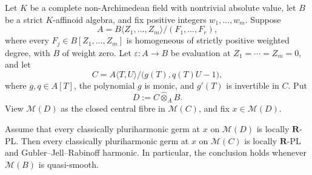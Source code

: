 \begin{theorem}
\label{thm:p061-standard-etale-weighted-cone-tube}
Let \(K\) be a complete non-Archimedean field with nontrivial absolute
value, let \(B\) be a strict \(K\)-affinoid algebra, and fix positive
integers \(w_1,\ldots,w_m\).  Suppose
\[
 A=B\langle Z_1,\ldots,Z_m\rangle/(F_1,\ldots,F_r),
\]
where every \(F_j\in B[Z_1,\ldots,Z_m]\) is homogeneous of strictly
positive weighted degree, with \(B\) of weight zero.  Let
\(\varepsilon:A\to B\) be evaluation at \(Z_1=\cdots=Z_m=0\), and let
\[
 C=A\langle T,U\rangle/\bigl(g(T),q(T)U-1\bigr),
 \tag{\(\heartsuit\)}\label{eq:p061-standard-etale-cone-presentation}
\]
where \(g,q\in A[T]\), the polynomial \(g\) is monic, and \(g'(T)\) is
invertible in \(C\).  Put
\[
                         D:=C\widehat\otimes_A B.
\]
View \(\mathcal M(D)\) as the closed central fibre in \(\mathcal M(C)\),
and fix \(x\in\mathcal M(D)\).

Assume that every classically pluriharmonic germ at \(x\) on
\(\mathcal M(D)\) is locally \(\mathbf R\)-PL.  Then every classically
pluriharmonic germ at \(x\) on \(\mathcal M(C)\) is locally
\(\mathbf R\)-PL and Gubler--Jell--Rabinoff harmonic.  In particular, the
conclusion holds whenever \(\mathcal M(B)\) is quasi-smooth.
\end{theorem}
